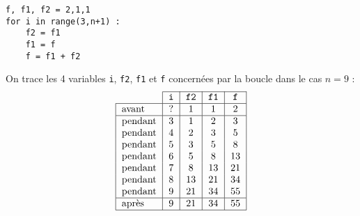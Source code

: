 \begin{py}{4cm}
\begin{verbatim}
f, f1, f2 = 2,1,1
for i in range(3,n+1) :
    f2 = f1
    f1 = f
    f = f1 + f2
\end{verbatim}
\end{py}
\hfill
\begin{py}{10cm}
On trace les 4 variables {\tt i}, {\tt f2}, {\tt f1} et {\tt f}
concernées par la boucle  dans le cas $n = 9$ :
$$\begin{tabular}{|l|c|c|c|c|}
\cline{2-5}
\multicolumn{1}{c|}{} & \tt i & \tt f2 & \tt f1 & \tt f \\
\hline
avant & ? & 1 & 1 & 2 \\
\hline
pendant & 3  & 1  & 2  & 3 \\
pendant & 4  & 2  & 3  & 5 \\
pendant & 5  & 3  & 5  & 8 \\
pendant & 6  & 5  & 8  & 13 \\
pendant & 7  & 8  & 13  & 21 \\
pendant & 8  & 13  & 21  & 34 \\
pendant & 9  & 21  & 34  & 55 \\
\hline
après & 9  & 21  & 34  & 55 \\
\hline
\end{tabular}$$
\end{py}\\

